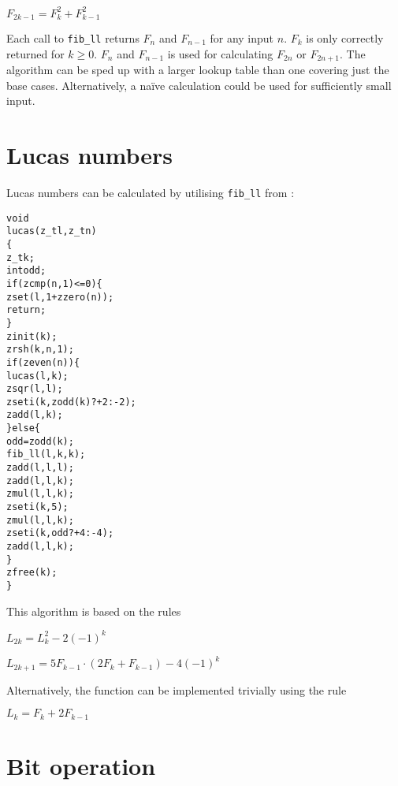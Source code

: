 \( \displaystyle{
    F_{2k - 1} = F_k^2 + F_{k - 1}^2
}\)
\vspace{1em}

\noindent
Each call to {\tt fib\_ll} returns $F_n$ and $F_{n - 1}$
for any input $n$. $F_{k}$ is only correctly returned
for $k \ge 0$. $F_n$ and $F_{n - 1}$ is used for
calculating $F_{2n}$ or $F_{2n + 1}$. The algorithm
can be sped up with a larger lookup table than one
covering just the base cases. Alternatively, a naïve
calculation could be used for sufficiently small input.


\newpage
\section{Lucas numbers}
\label{sec:Lucas numbers}

Lucas numbers can be calculated by utilising
{\tt fib\_ll} from :

\begin{alltt}
   void
   lucas(z_t l, z_t n)
   \{
       z_t k;
       int odd;
       if (zcmp(n, 1) <= 0) \{
           zset(l, 1 + zzero(n));
           return;
       \}
       zinit(k);
       zrsh(k, n, 1);
       if (zeven(n)) \{
           lucas(l, k);
           zsqr(l, l);
           zseti(k, zodd(k) ? +2 : -2);
           zadd(l, k);
       \} else \{
           odd = zodd(k);
           fib_ll(l, k, k);
           zadd(l, l, l);
           zadd(l, l, k);
           zmul(l, l, k);
           zseti(k, 5);
           zmul(l, l, k);
           zseti(k, odd ? +4 : -4);
           zadd(l, l, k);
       \}
       zfree(k);
   \}
\end{alltt}

\noindent
This algorithm is based on the rules

\vspace{1em}
\( \displaystyle{
    L_{2k} = L_k^2 - 2(-1)^k
}\)
\vspace{1ex}

\( \displaystyle{
    L_{2k + 1} = 5F_{k - 1} \cdot (2F_k + F_{k - 1}) - 4(-1)^k
}\)
\vspace{1em}

\noindent
Alternatively, the function can be implemented
trivially using the rule

\vspace{1em}
\( \displaystyle{
    L_k = F_k + 2F_{k - 1}
}\)


\newpage
\section{Bit operation}
\label{sec:Bit operation unimplemented}

